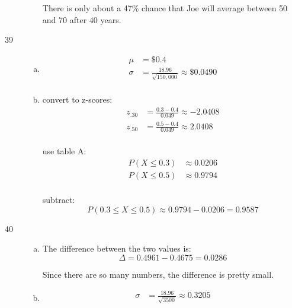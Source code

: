 \documentclass[letterpaper, landscape]{exam}
\newcommand{\cent}{\textcent\xspace}
\begin{document}
\begin{description}
\begin{enumerate}[(a)]
            There is only about a 47\% chance that Joe will average between
            50\cent{} and 70\cent{} after 40 years.

        \end{enumerate}

      \item[39]
        \begin{enumerate}[(a)]
          \item 
            \begin{align*}
              \mu    & = \boxed{ \$0.4 } \\
              \sigma & = \frac{18.96}{\sqrt{150,000}} \approx \boxed{ \$0.0490 }\\
            \end{align*}
            
          \item
            convert to z-scores:
            \begin{align*}
              z_{.30} &= \frac{0.3 - 0.4}{0.049} \approx -2.0408 \\ 
              z_{.50} &= \frac{0.5 - 0.4}{0.049} \approx 2.0408 \\
            \end{align*}

            use table A:\@
            \begin{align*}
              P(X \leq 0.3) &\approx 0.0206 \\
              P(X \leq 0.5) &\approx 0.9794 \\
            \end{align*}

            subtract:
            \[
              P(0.3 \leq X \leq 0.5) \approx 0.9794 - 0.0206 = \boxed{ 0.9587 }
            \]

        \end{enumerate}

      \newpage

      \item[40]
        \begin{enumerate}[(a)]
          \item The difference between the two values is:
            \[
              \Delta = 0.4961 - 0.4675 = \boxed{ 0.0286 }
            \]

            Since there are so many numbers, the difference is pretty small.

          \item
            \begin{align*}
              \sigma &= \frac{18.96}{\sqrt{3500}} \approx 0.3205 \\
            \end{align*}
            

\end{enumerate}
\end{description}
\end{document}
